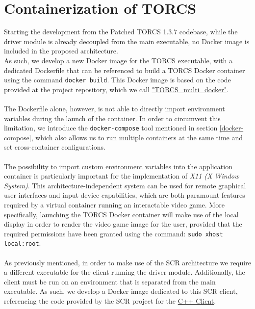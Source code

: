 \section{Containerization of TORCS}
Starting the development from the Patched TORCS 1.3.7 codebase, while the driver module is already decoupled from the main executable, no Docker image is included in the proposed architecture. \\
As such, we develop a new Docker image for the TORCS executable, with a dedicated Dockerfile that can be referenced to build a TORCS Docker container using the command \texttt{docker build}. This Docker image is based on the code provided at the project repository, which we call \href{https://github.com/DrSgre/TORCS_multi_docker}{"TORCS\_multi\_docker"}. \\ \\
The Dockerfile alone, however, is not able to directly import environment variables during the launch of the container. In order to circumvent this limitation, we introduce the \texttt{docker-compose} tool mentioned in section \ref{docker-compose}, which also allows us to run multiple containers at the same time and set cross-container configurations. \\ \\
The possibility to import custom environment variables into the application container is particularly important for the implementation of \textit{X11 (X Window System)}. This architecture-independent system can be used for remote graphical user interfaces and input device capabilities, which are both paramount features required by a virtual container running an interactable video game. More specifically, launching the TORCS Docker container will make use of the local display in order to render the video game image for the user, provided that the required permissions have been granted using the command: \texttt{sudo xhost local:root}. \\ \\
As previously mentioned, in order to make use of the SCR architecture we require a different executable for the client running the driver module. Additionally, the client must be run on an environment that is separated from the main executable. As such, we develop a Docker image dedicated to this SCR client, referencing the code provided by the SCR project for the \href{https://sourceforge.net/projects/cig/files/SCR\%20Championship/Client\%20C\%2B\%2B/}{C++ Client}. \\ \\
